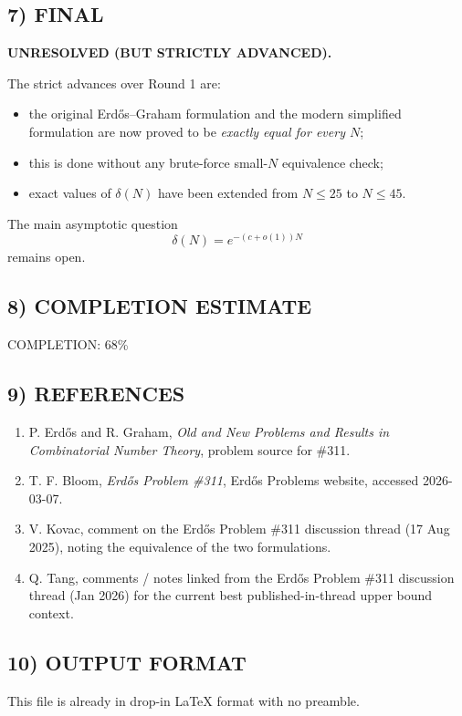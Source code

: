 \subsection*{7) FINAL}
\textbf{UNRESOLVED (BUT STRICTLY ADVANCED).}

The strict advances over Round 1 are:

\begin{itemize}
\item the original Erd\H{o}s--Graham formulation and the modern simplified formulation are now proved to be \emph{exactly equal for every $N$};
\item this is done without any brute-force small-$N$ equivalence check;
\item exact values of $\delta(N)$ have been extended from $N\le 25$ to $N\le 45$.
\end{itemize}

The main asymptotic question
\[
\delta(N)=e^{-(c+o(1))N}
\]
remains open.

\subsection*{8) COMPLETION ESTIMATE}
COMPLETION: 68\%

\subsection*{9) REFERENCES}
\begin{enumerate}
\item P. Erd\H{o}s and R. Graham, \emph{Old and New Problems and Results in Combinatorial Number Theory}, problem source for \#311.
\item T. F. Bloom, \emph{Erd\H{o}s Problem \#311}, Erd\H{o}s Problems website, accessed 2026-03-07.
\item V. Kovac, comment on the Erd\H{o}s Problem \#311 discussion thread (17 Aug 2025), noting the equivalence of the two formulations.
\item Q. Tang, comments / notes linked from the Erd\H{o}s Problem \#311 discussion thread (Jan 2026) for the current best published-in-thread upper bound context.
\end{enumerate}

\subsection*{10) OUTPUT FORMAT}
This file is already in drop-in LaTeX format with no preamble.


